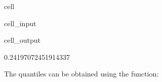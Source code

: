 \documentclass[letterpaper,10pt,english]{jupyterBook}
\begin{document}
\begin{sphinxuseclass}{cell}\begin{sphinxVerbatimInput}

\begin{sphinxuseclass}{cell_input}
\begin{sphinxVerbatim}[commandchars=\\\{\}]
    
  
\end{sphinxVerbatim}

\end{sphinxuseclass}\end{sphinxVerbatimInput}
\begin{sphinxVerbatimOutput}

\begin{sphinxuseclass}{cell_output}
\begin{sphinxVerbatim}[commandchars=\\\{\}]
0.24197072451914337
\end{sphinxVerbatim}

\end{sphinxuseclass}\end{sphinxVerbatimOutput}

\end{sphinxuseclass}
\sphinxAtStartPar
The quantiles can be obtained using the  function:
\end{document}
